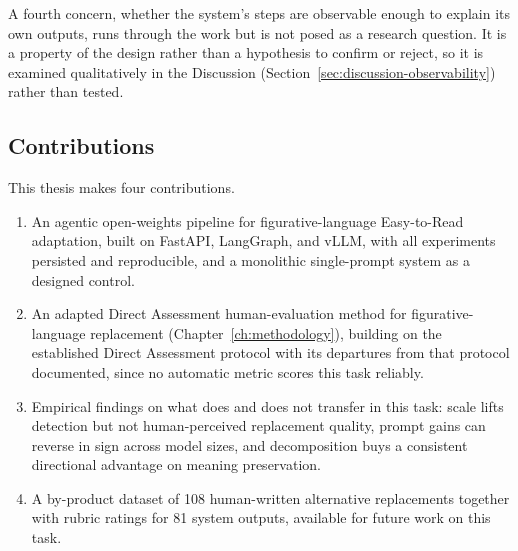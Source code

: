 A fourth concern, whether the system's steps are observable enough to explain
its own outputs, runs through the work but is not posed as a research question.
It is a property of the design rather than a hypothesis to confirm or reject,
so it is examined qualitatively in the Discussion
(Section~\ref{sec:discussion-observability}) rather than tested.

\subsection{Contributions}

This thesis makes four contributions.

\begin{enumerate}
  \item An agentic open-weights pipeline for figurative-language Easy-to-Read
    adaptation, built on FastAPI, LangGraph, and vLLM, with all experiments
    persisted and reproducible, and a monolithic single-prompt system as a
    designed control.
  \item An adapted Direct Assessment human-evaluation method for
    figurative-language replacement (Chapter~\ref{ch:methodology}), building on
    the established Direct Assessment protocol
    \cite{Graham2013, graham-2015-improving, Graham2017}
    with its departures from that protocol documented, since no automatic
    metric scores this task reliably.
  \item Empirical findings on what does and does not transfer in this task:
    scale lifts detection but not human-perceived replacement quality, prompt
    gains can reverse in sign across model sizes, and decomposition buys a
    consistent directional advantage on meaning preservation.
  \item A by-product dataset of 108 human-written alternative replacements
    together with rubric ratings for 81 system outputs, available for future
    work on this task.
\end{enumerate}

